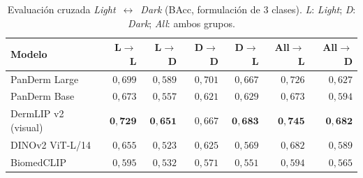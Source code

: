 \begin{table}[H]
\centering
\footnotesize
\setlength{\tabcolsep}{4pt}
\caption{Evaluación cruzada \emph{Light}~$\leftrightarrow$~\emph{Dark}
(BAcc, formulación de $3$ clases). \emph{L}: \emph{Light};
\emph{D}: \emph{Dark}; \emph{All}: ambos grupos.}
\label{tab:cross-eval}
\begin{tabular}{lrrrrrr}
\hline
Modelo                    & L$\to$L       & L$\to$D       & D$\to$D       & D$\to$L       & All$\to$L     & All$\to$D \\
\hline
PanDerm Large             & $0{,}699$     & $0{,}589$     & $0{,}701$     & $0{,}667$     & $0{,}726$     & $0{,}627$ \\
PanDerm Base              & $0{,}673$     & $0{,}557$     & $0{,}621$     & $0{,}629$     & $0{,}673$     & $0{,}594$ \\
DermLIP v2 (visual)       & $\mathbf{0{,}729}$ & $\mathbf{0{,}651}$ & $0{,}667$ & $\mathbf{0{,}683}$ & $\mathbf{0{,}745}$ & $\mathbf{0{,}682}$ \\
DINOv2 ViT-L/14           & $0{,}655$     & $0{,}523$     & $0{,}625$     & $0{,}569$     & $0{,}682$     & $0{,}589$ \\
BiomedCLIP                & $0{,}595$     & $0{,}532$     & $0{,}571$     & $0{,}551$     & $0{,}594$     & $0{,}565$ \\
\hline
\end{tabular}
\end{table}
